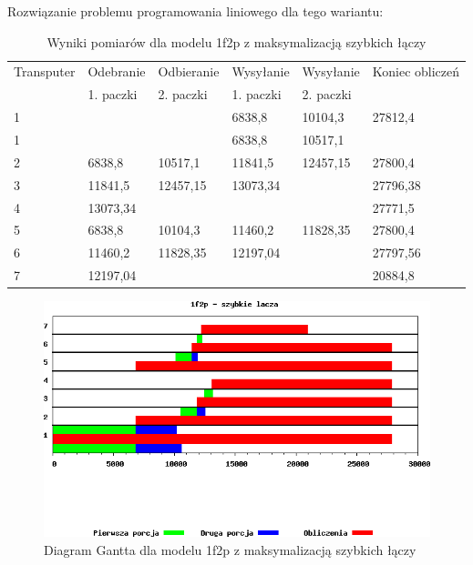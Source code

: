 \documentclass[a4paper,11pt, titlepage]{article}
\begin{document}
Rozwiązanie problemu programowania liniowego dla tego wariantu:
\begin{table}[hp!]
\begin{tabular}{|l|l|l|l|l|l|}\hline
Transputer&Odebranie&Odbieranie&Wysyłanie&Wysyłanie&Koniec obliczeń\\
&1. paczki&2. paczki&1. paczki&2. paczki&\\ \hline
1	&			&			&6838,8		&10104,3	&27812,4\\ \hline
1	&			&			&6838,8		&10517,1	&\\ \hline
2	&6838,8		&10517,1	&11841,5	&12457,15	&27800,4\\ \hline
3	&11841,5	&12457,15	&13073,34	&			&27796,38\\ \hline
4	&13073,34	&			&			&			&27771,5\\ \hline
5	&6838,8		&10104,3	&11460,2	&11828,35	&27800,4\\ \hline
6	&11460,2	&11828,35	&12197,04	&			&27797,56\\ \hline
7	&12197,04	&			&			&			&20884,8\\ \hline
\end{tabular}
\caption{Wyniki pomiarów dla modelu 1f2p z maksymalizacją szybkich łączy \label{1f2p_lt}}
\end{table}

\begin{figure}[p!]
\includegraphics[width=1.0\textwidth]{wykresy/2p1f_lacza}
\caption{Diagram Gantta dla modelu 1f2p z maksymalizacją szybkich łączy \label{2p1f_l}}
\end{figure}
\clearpage
\end{document}
